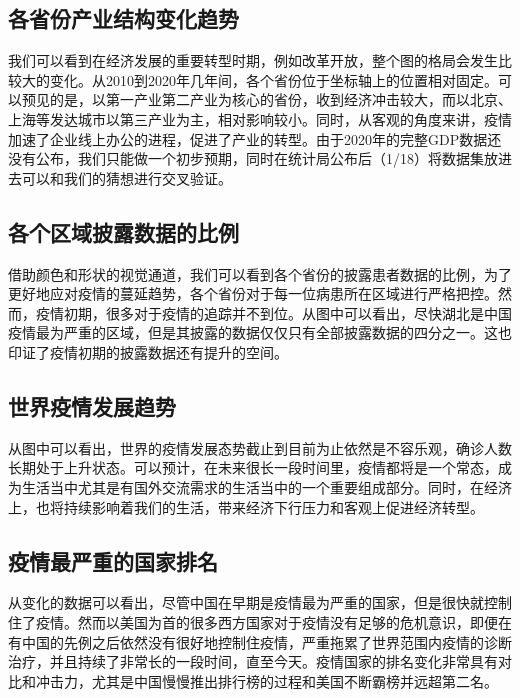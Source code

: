 \documentclass{ctexart}
\begin{document}
\subsection{各省份产业结构变化趋势}
我们可以看到在经济发展的重要转型时期，例如改革开放，整个图的格局会发生比较大的变化。从2010到2020年几年间，各个省份位于坐标轴上的位置相对固定。可以预见的是，以第一产业第二产业为核心的省份，收到经济冲击较大，而以北京、上海等发达城市以第三产业为主，相对影响较小。同时，从客观的角度来讲，疫情加速了企业线上办公的进程，促进了产业的转型。由于2020年的完整GDP数据还没有公布，我们只能做一个初步预期，同时在统计局公布后（1/18）将数据集放进去可以和我们的猜想进行交叉验证。
\subsection{各个区域披露数据的比例}
借助颜色和形状的视觉通道，我们可以看到各个省份的披露患者数据的比例，为了更好地应对疫情的蔓延趋势，各个省份对于每一位病患所在区域进行严格把控。然而，疫情初期，很多对于疫情的追踪并不到位。从图中可以看出，尽快湖北是中国疫情最为严重的区域，但是其披露的数据仅仅只有全部披露数据的四分之一。这也印证了疫情初期的披露数据还有提升的空间。
\subsection{世界疫情发展趋势}
从图中可以看出，世界的疫情发展态势截止到目前为止依然是不容乐观，确诊人数长期处于上升状态。可以预计，在未来很长一段时间里，疫情都将是一个常态，成为生活当中尤其是有国外交流需求的生活当中的一个重要组成部分。同时，在经济上，也将持续影响着我们的生活，带来经济下行压力和客观上促进经济转型。
\subsection{疫情最严重的国家排名}
从变化的数据可以看出，尽管中国在早期是疫情最为严重的国家，但是很快就控制住了疫情。然而以美国为首的很多西方国家对于疫情没有足够的危机意识，即便在有中国的先例之后依然没有很好地控制住疫情，严重拖累了世界范围内疫情的诊断治疗，并且持续了非常长的一段时间，直至今天。疫情国家的排名变化非常具有对比和冲击力，尤其是中国慢慢推出排行榜的过程和美国不断霸榜并远超第二名。
\end{document}
